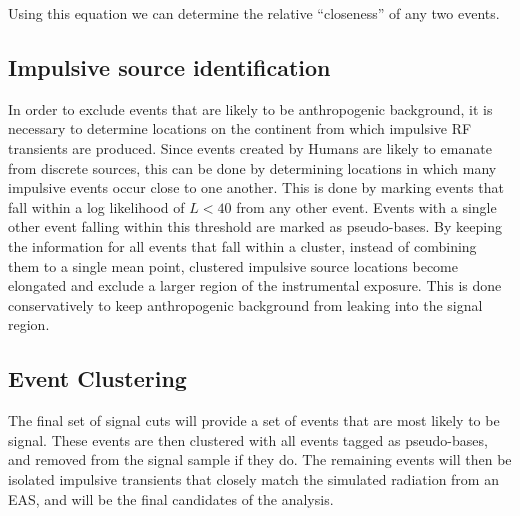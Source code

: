		Using this equation we can determine the relative ``closeness'' of any two events.  
		
	
	\subsection{Impulsive source identification}
		In order to exclude events that are likely to be anthropogenic background, it is necessary to determine locations on the continent from which impulsive RF transients are produced.  Since events created by Humans are likely to emanate from discrete sources, this can be done by determining locations in which many impulsive events occur close to one another.  This is done by marking events that fall within a log likelihood of $L<40$ from any other event.  Events with a single other event falling within this threshold are marked as pseudo-bases.  By keeping the information for all events that fall within a cluster, instead of combining them to a single mean point, clustered impulsive source locations become elongated and exclude a larger region of the instrumental exposure.  This is done conservatively to keep anthropogenic background from leaking into the signal region.
		
	\subsection{Event Clustering}
		The final set of signal cuts will provide a set of events that are most likely to be signal.  These events are then clustered with all events tagged as pseudo-bases, and removed from the signal sample if they do.  The remaining events will then be isolated impulsive transients that closely match the simulated radiation from an EAS, and will be the final candidates of the analysis.



	